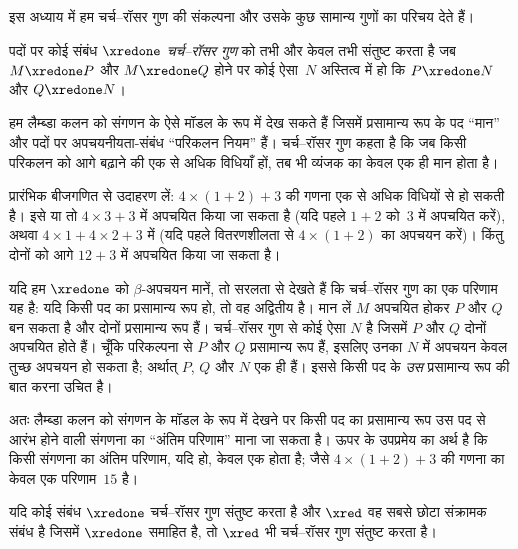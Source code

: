 \documentclass[../../../include/open-logic-section]{subfiles}
\begin{document}


इस अध्याय में हम चर्च--रॉसर गुण की संकल्पना और उसके कुछ सामान्य गुणों का
परिचय देते हैं।

\begin{defn}[चर्च--रॉसर गुण, CR] पदों पर कोई संबंध $\xredone$
  \emph{चर्च--रॉसर गुण} को तभी और केवल तभी संतुष्ट करता है जब $M \xredone
  P$ और $M \xredone Q$ होने पर कोई ऐसा~$N$ अस्तित्व में हो कि $P
  \xredone N$ और $Q \xredone N$।
\end{defn}

हम लैम्ब्डा कलन को संगणन के ऐसे मॉडल के रूप में देख सकते हैं जिसमें
प्रसामान्य रूप के पद ``मान'' और पदों पर अपचयनीयता-संबंध ``परिकलन नियम''
हैं। चर्च--रॉसर गुण कहता है कि जब किसी परिकलन को आगे बढ़ाने की एक से अधिक
विधियाँ हों, तब भी व्यंजक का केवल एक ही मान होता है।

प्रारंभिक बीजगणित से उदाहरण लें: $4 \times (1+2) + 3$ की गणना एक से अधिक
विधियों से हो सकती है। इसे या तो $4 \times 3+3$ में अपचयित किया जा सकता
है (यदि पहले $1+2$ को~$3$ में अपचयित करें), अथवा $4 \times 1+4 \times
2+3$ में (यदि पहले वितरणशीलता से $4 \times (1+2)$ का अपचयन करें)। किंतु
दोनों को आगे $12+3$ में अपचयित किया जा सकता है।

यदि हम $\xredone$ को $\beta$-अपचयन मानें, तो सरलता से देखते हैं कि
चर्च--रॉसर गुण का एक परिणाम यह है: यदि किसी पद का प्रसामान्य रूप हो, तो वह
अद्वितीय है। मान लें $M$ अपचयित होकर $P$ और $Q$ बन सकता है और दोनों
प्रसामान्य रूप हैं। चर्च--रॉसर गुण से कोई ऐसा $N$ है जिसमें $P$ और $Q$
दोनों अपचयित होते हैं। चूँकि परिकल्पना से $P$ और $Q$ प्रसामान्य रूप हैं,
इसलिए उनका $N$ में अपचयन केवल तुच्छ अपचयन हो सकता है; अर्थात् $P$, $Q$ और
$N$ एक ही हैं। इससे किसी पद के \emph{उस} प्रसामान्य रूप की बात करना उचित
है।

अतः लैम्ब्डा कलन को संगणन के मॉडल के रूप में देखने पर किसी पद का प्रसामान्य
रूप उस पद से आरंभ होने वाली संगणना का ``अंतिम परिणाम'' माना जा सकता है।
ऊपर के उपप्रमेय का अर्थ है कि किसी संगणना का अंतिम परिणाम, यदि हो, केवल एक
होता है; जैसे $4 \times (1+2)+3$ की गणना का केवल एक परिणाम~$15$ है।

\begin{thm} 
  यदि कोई संबंध $\xredone$ चर्च--रॉसर गुण संतुष्ट करता है और $\xred$ वह
  सबसे छोटा संक्रामक संबंध है जिसमें $\xredone$ समाहित है, तो $\xred$ भी
  चर्च--रॉसर गुण संतुष्ट करता है।
\end{thm}
\end{document}
